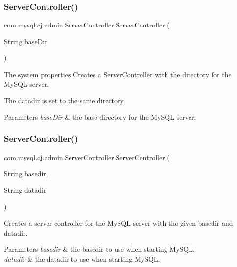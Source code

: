\subsubsection{\texorpdfstring{Server\+Controller()}{ServerController()}\hspace{0.1cm}{\footnotesize\ttfamily [1/2]}}
{\footnotesize\ttfamily com.\+mysql.\+cj.\+admin.\+Server\+Controller.\+Server\+Controller (\begin{DoxyParamCaption}\item[{String}]{base\+Dir }\end{DoxyParamCaption})}

The system properties Creates a \mbox{\hyperlink{classcom_1_1mysql_1_1cj_1_1admin_1_1_server_controller}{Server\+Controller}} with the directory for the My\+S\+QL server.

The \textquotesingle{}datadir\textquotesingle{} is set to the same directory.


\begin{DoxyParams}{Parameters}
{\em base\+Dir} & the base directory for the My\+S\+QL server. \\
\hline
\end{DoxyParams}
\mbox{\label{classcom_1_1mysql_1_1cj_1_1admin_1_1_server_controller_ab9a8133153b7cfe56d8071deb50dc307}} 
\subsubsection{\texorpdfstring{Server\+Controller()}{ServerController()}\hspace{0.1cm}{\footnotesize\ttfamily [2/2]}}
{\footnotesize\ttfamily com.\+mysql.\+cj.\+admin.\+Server\+Controller.\+Server\+Controller (\begin{DoxyParamCaption}\item[{String}]{basedir,  }\item[{String}]{datadir }\end{DoxyParamCaption})}

Creates a server controller for the My\+S\+QL server with the given basedir and datadir.


\begin{DoxyParams}{Parameters}
{\em basedir} & the basedir to use when starting My\+S\+QL. \\
\hline
{\em datadir} & the datadir to use when starting My\+S\+QL. \\
\hline
\end{DoxyParams}


